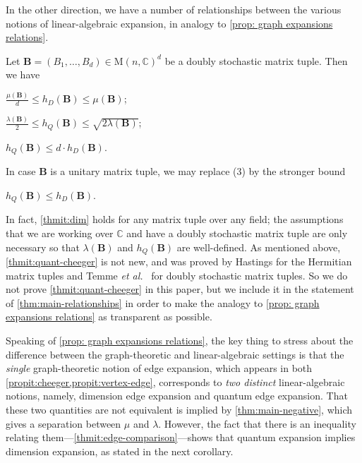 \documentclass{toc}
\theoremstyle{plain}
\numberwithin{equation}{section}
\theoremstyle{definition}
\newcommand{\bC}{\mathbb{C}}
\newcommand{\M}{\mathrm{M}}
\newcommand{\tuple}[1]{\mathbf{#1}}
\newcommand{\vB}{\tuple{B}}
\begin{document}
In the other direction, we have a number of relationships between the various notions of linear-algebraic expansion, in analogy to \cref{prop: graph expansions relations}.
\begin{theorem}\label{thm:main-relationships}
    Let $\vB=(B_1,\dots,B_d) \in \M(n,\bC)^d$ be a doubly stochastic matrix tuple. Then we have
    \begin{thmenum}
        \item $\frac {\mu(\vB)}d \leq h_D(\vB) \leq \mu(\vB)$;\label{thmit:dim}
        \item $\frac{\lambda(\vB)}{2} \leq h_Q(\vB) \leq \sqrt{2\lambda(\vB)}$;\label{thmit:quant-cheeger}
        \item $h_Q(\vB) \leq d\cdot h_D(\vB)$.\label{thmit:edge-comparison}
    \end{thmenum}
    In case $\vB$ is a unitary matrix tuple, we may replace {\rm (3)} by the stronger bound
    \begin{thmenum}[start=4]
        \item $h_Q(\vB) \leq h_D(\vB)$.\label{thmit:unitary-edge-comparison}
    \end{thmenum}
\end{theorem}
In fact, \cref{thmit:dim} holds for any matrix tuple over any field; the assumptions that we are working over $\bC$ and have a doubly stochastic matrix tuple are only necessary so that $\lambda(\vB)$ and $h_Q(\vB)$ are well-defined. As mentioned above, \cref{thmit:quant-cheeger} is not new, and was proved by Hastings \cite[Appendix A]{PhysRevA.76.032315} for the Hermitian matrix tuples and Temme \emph{et al.}~\cite[Lemma 20]{10.1063/1.3511335} for doubly stochastic matrix tuples. So we do not prove \cref{thmit:quant-cheeger} in this paper, but we include it in the statement of \cref{thm:main-relationships} in order to make the analogy to \cref{prop: graph expansions relations} as transparent as possible.

Speaking of \cref{prop: graph expansions relations}, the key thing to stress about the difference between the graph-theoretic and linear-algebraic settings is that the \emph{single} graph-theoretic notion of edge expansion, which appears in both \cref{propit:cheeger,propit:vertex-edge}, corresponds to \emph{two distinct} linear-algebraic notions,
namely,  %
dimension edge expansion and quantum edge expansion. That these two quantities are not equivalent is implied by \cref{thm:main-negative}, which gives a separation between $\mu$ and $\lambda$. However, the fact that there is an inequality relating them---\cref{thmit:edge-comparison}---shows that quantum expansion implies dimension expansion, as stated in the next corollary.
\end{document}

